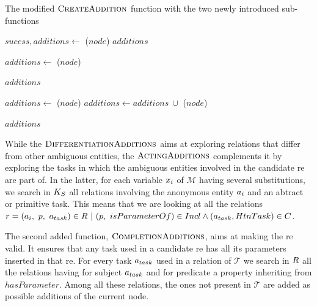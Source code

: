 \begin{algorithm}[htb!]
\caption{\label{alg:chap6_additions} The modified $\textsc{CreateAddition}$ function with the two newly introduced sub-functions}

\begin{algorithmic}

        \State $sucess, additions\leftarrow$ \typingadditions($node$)
            \Return $additions$
        \EndIf
        
        \State $additions\leftarrow$ \completionadditions($node$) 
        
            \Return $additions$
        \EndIf
        
        \State $additions\leftarrow$ \actingadditions($node$) 
        \State $additions\leftarrow additions\ \cup$ \differenceadditions($node$) 
        
        \Return $additions$
    \EndFunction
    
\end{algorithmic}
\end{algorithm}

While the $\textsc{DifferentiationAdditions}$ aims at exploring relations that differ from other ambiguous entities, the $\textsc{ActingAdditions}$ complements it by exploring the tasks in which the ambiguous entities involved in the candidate \acrshort{re} are part of. In the latter, for each variable $x_i$ of $\mathcal{M}$ having several substitutions, we search in $K_S$ all relations involving the anonymous entity $a_i$ and an abtract or primitive task. This means that we are looking at all the relations $\relation = (\indiv_i,\ \property,\ \indiv_{task}) \in \relationset\ |\ (\property,\ isParameterOf) \in \inclset \wedge (\indiv_{task}, HtnTask) \in \inheritset$.

The second added function, $\textsc{CompletionAdditions}$, aims at making the \acrshort{re} valid. It ensures that any task used in a candidate \acrshort{re} has all its parameters inserted in that \acrshort{re}. For every task $a_{task}$ used in a relation of $\mathcal{T}$ we search in $R$ all the relations having for subject $a_{task}$ and for predicate a property inheriting from $hasParameter$. Among all these relations, the ones not present in $\mathcal{T}$ are added as possible additions of the current node.

